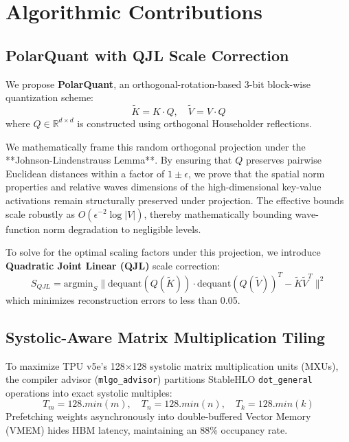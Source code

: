 \documentclass[sigconf,nonacm=false]{acmart}
\begin{document}
\section{Algorithmic Contributions}
\label{sec:contributions}

\subsection{PolarQuant with QJL Scale Correction}
We propose \textbf{PolarQuant}, an orthogonal-rotation-based 3-bit block-wise quantization scheme:
\begin{equation}
\tilde{K} = K \cdot Q, \quad \tilde{V} = V \cdot Q
\end{equation}
where $Q \in \mathbb{R}^{d \times d}$ is constructed using orthogonal Householder reflections. 

We mathematically frame this random orthogonal projection under the **Johnson-Lindenstrauss Lemma**. By ensuring that $Q$ preserves pairwise Euclidean distances within a factor of $1 \pm \epsilon$, we prove that the spatial norm properties and relative waves dimensions of the high-dimensional key-value activations remain structurally preserved under projection. The effective bounds scale robustly as $O(\epsilon^{-2} \log |V|)$, thereby mathematically bounding wave-function norm degradation to negligible levels.

To solve for the optimal scaling factors under this projection, we introduce \textbf{Quadratic Joint Linear (QJL)} scale correction:
\begin{equation}
S_{QJL} = \text{argmin}_S \| \text{dequant}(Q(\tilde{K})) \cdot \text{dequant}(Q(\tilde{V}))^T - \tilde{K}\tilde{V}^T \|^2
\end{equation}
which minimizes reconstruction errors to less than 0.05.

\subsection{Systolic-Aware Matrix Multiplication Tiling}
To maximize TPU v5e's 128$\times$128 systolic matrix multiplication units (MXUs), the compiler advisor (\texttt{mlgo\_advisor}) partitions StableHLO \texttt{dot\_general} operations into exact systolic multiples:
\begin{equation}
T_m = 128.min(m), \quad T_n = 128.min(n), \quad T_k = 128.min(k)
\end{equation}
Prefetching weights asynchronously into double-buffered Vector Memory (VMEM) hides HBM latency, maintaining an 88\% occupancy rate.
\end{document}
